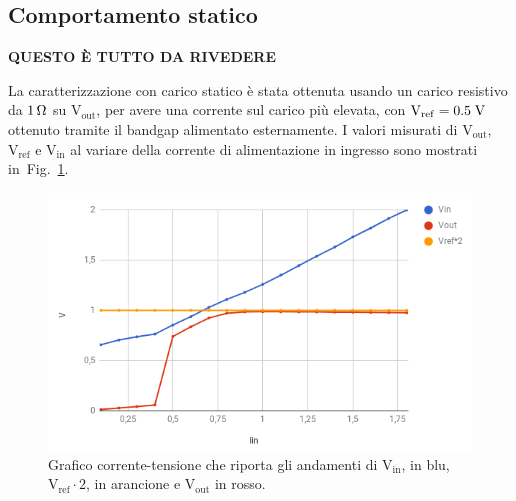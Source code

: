 \subsection{Comportamento statico}

\par \begin{center} {\huge\bf QUESTO \`E TUTTO DA RIVEDERE } \end{center} \par

La caratterizzazione con carico statico è stata ottenuta usando un carico resistivo da $1{\rm \, \Omega}$ su $\mathrm{V_{out}}$, per avere una corrente sul carico pi\`u elevata, con $\mathrm{V_{ref}} = 0.5 \rm \; V$ ottenuto tramite il bandgap alimentato esternamente.
I valori misurati di $\mathrm{V_{out}}$, $\mathrm{V_{ref}}$ e $\mathrm{V_{in}}$ al variare della corrente di alimentazione in ingresso sono mostrati in~Fig.~\ref{SLDO2Astatic}.

\begin{figure}
\centering
\includegraphics[scale=.5]{Immagini/SLDO2Astaticbis}
\caption{Grafico corrente-tensione che riporta gli andamenti di $\mathrm{V_{in}}$, in blu, $\mathrm{V_{ref}\cdot 2}$, in arancione e $\mathrm{V_{out}}$ in rosso.}
\label{SLDO2Astatic}
\end{figure}

